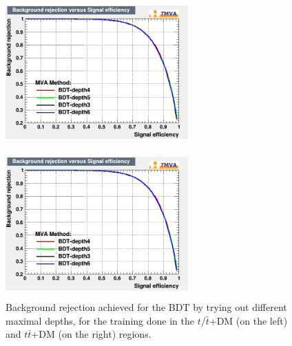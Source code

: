 \documentclass[a4paper, 10pt, openright]{report}
\begin{document}
\begin{appendices}

\begin{figure}[htbp]
\centering
\begin{minipage}[b]{.48\textwidth}
\includegraphics[width=7cm, height=5.7cm]{figs/BDT_depth_ST.png}
\end{minipage}\hfill
\begin{minipage}[b]{.48\textwidth}
\includegraphics[width=7cm, height=5.7cm]{figs/BDT_depth_TTbar.png}
\end{minipage} \hfill
\caption{Background rejection achieved for the \ac{BDT} by trying out different maximal depths, for the training done in the $t/ \bar t$+DM (on the left) and $t \bar t$+DM (on the right) regions.}
\label{fig:optDepth}
\end{figure}


\end{appendices}
\end{document}
